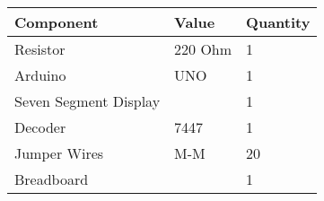 \begin{tabular}{|p{2.25cm}|p{3cm}|p{2cm}|}
	\hline
	Component& Value& Quantity\\
	\hline
	Resistor &220 Ohm& 1\\
	\hline
	Arduino& UNO& 1\\
	\hline
	Seven Segment Display&  & 1\\              
	\hline                                     
	Decoder& 7447& 1\\                         
	\hline                                    
	Jumper Wires& M-M& 20\\                  
	\hline                                    
	Breadboard&  & 1\\                         
	\hline                                     
\end{tabular}

